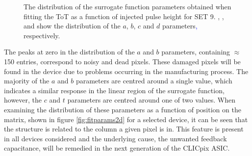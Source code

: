 \begin{figure}[h!]
\caption[The distribution of the surrogate function parameters obtained when fitting the ToT as a function of injected pulse height for SET 9.  \protect{}, \protect{}, \protect{} and \protect{} show the distribution of the $a$, $b$, $c$ and $d$ parameters\textcolor{blue}{,} respectively.]{The distribution of the surrogate function parameters obtained when fitting the ToT as a function of injected pulse height for SET 9.  \protect{}, \protect{}, \protect{} and \protect{} show the distribution of the $a$, $b$, $c$ and $d$ parameters\textcolor{blue}{,} respectively.}  
\label{fig:fitparams}
\end{figure}

The peaks at zero in the distribution of the $a$ and $b$ parameters, containing $\approx$ 150 entries, correspond to noisy and dead pixels.  These damaged pixels will be found in the device due to problems occurring in the manufacturing process.  The majority of the $a$ and $b$ parameters are centred around a single value, which indicates a similar response in the linear region of the surrogate function, however, the $c$ and $t$ parameters are centred around one of two values.  When examining the distribution of these parameters as a function of position on the matrix, shown in figure \ref{fig:fitparams2d} for a selected device, it can be seen that the structure is related to the column a given pixel is in.  This feature is present in all devices considered and the underlying cause, the unwanted feedback capacitance, will be remedied in the next generation of the CLICpix ASIC.

